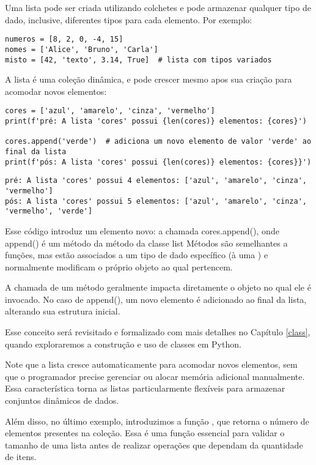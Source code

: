 Uma lista pode ser criada utilizando colchetes \inlcode{[]} e pode armazenar qualquer tipo de dado, inclusive, diferentes tipos para cada elemento.
Por exemplo:
\begin{verbatim}
numeros = [8, 2, 0, -4, 15]
nomes = ['Alice', 'Bruno', 'Carla']
misto = [42, 'texto', 3.14, True]  # lista com tipos variados
\end{verbatim}

A lista é uma coleção dinâmica, e pode crescer mesmo apos sua criação para acomodar novos elementos:
\begin{verbatim}
cores = ['azul', 'amarelo', 'cinza', 'vermelho']
print(f'pré: A lista 'cores' possui {len(cores)} elementos: {cores}')

cores.append('verde')  # adiciona um novo elemento de valor 'verde' ao final da lista
print(f'pós: A lista 'cores' possui {len(cores)} elementos: {cores}}')
\end{verbatim}
\begin{verbatim}
pré: A lista 'cores' possui 4 elementos: ['azul', 'amarelo', 'cinza', 'vermelho']
pós: A lista 'cores' possui 5 elementos: ['azul', 'amarelo', 'cinza', 'vermelho', 'verde']
\end{verbatim}

Esse código introduz um elemento novo: a chamada cores.append(), onde append() é um método da método da classe list
Métodos são semelhantes a funções, mas estão associados a um tipo de dado específico (à uma ) e
normalmente modificam o próprio objeto ao qual pertencem.

A chamada de um método geralmente impacta diretamente o objeto no qual ele é invocado.
No caso de append(), um novo elemento é adicionado ao final da lista, alterando sua estrutura inicial.

Esse conceito será revisitado e formalizado com mais detalhes no Capítulo \ref{class}, quando exploraremos a
construção e uso de classes em Python.

Note que a lista cresce automaticamente para acomodar novos elementos, sem que o programador precise gerenciar ou
alocar memória adicional manualmente.
Essa característica torna as listas particularmente flexíveis para armazenar conjuntos dinâmicos de dados.

Além disso, no último exemplo, introduzimos a função , que retorna o número de elementos presentes na coleção.
Essa é uma função essencial para validar o tamanho de uma lista antes de realizar operações que dependam da quantidade de itens.

